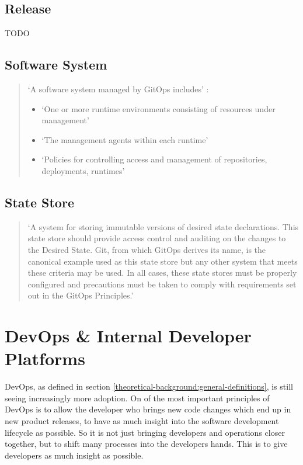 \subsection*{Release}
TODO

\subsection*{Software System}
\begin{quotation}
\noindent
\enquote*{A software system managed by GitOps includes} \autocite{gitopsGlossary}:
\begin{itemize}
	\item \enquote*{One or more runtime environments consisting of resources under management}
	\item \enquote*{The management agents within each runtime}
	\item \enquote*{Policies for controlling access and management of repositories, deployments, runtimes}
	\autocite{gitopsGlossary}
\end{itemize}
\end{quotation}

\subsection*{State Store}
\begin{quotation}
\noindent
\enquote*{A system for storing immutable versions of desired state declarations. This state store should provide access control and auditing on the changes to the Desired State. Git, from which GitOps derives its name, is the canonical example used as this state store but any other system that meets these criteria may be used. In all cases, these state stores must be properly configured and precautions must be taken to comply with requirements set out in the GitOps Principles.}
\autocite{gitopsGlossary}
\end{quotation}













\section{DevOps \& Internal Developer Platforms}

DevOps, as defined in section \ref{theoretical-background:general-definitions},
is still seeing increasingly more adoption.
On of the most important principles of DevOps is
to allow the developer who brings new code changes
which end up in new product releases,
to have as much insight into the software development lifecycle as possible.
So it is not just bringing developers and operations closer together,
but to shift many processes into the developers hands.
This is to give developers as much insight as possible.

